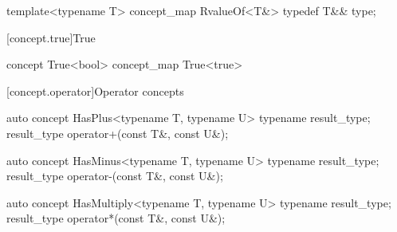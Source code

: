 \documentclass[american,twoside]{book}
\begin{document}
\begin{itemdecl}
template<typename T> concept_map RvalueOf<T&> {
  typedef T&& type;
}
\end{itemdecl}

\begin{itemdescr}
\pnum
{}
\end{itemdescr}

[concept.true]{True}

\begin{itemdecl}
concept True<bool> { }
concept_map True<true> { }
\end{itemdecl}

\begin{itemdescr}
\pnum
{}

\pnum
{}
\end{itemdescr}

[concept.operator]{Operator concepts}
\begin{itemdecl}
auto concept HasPlus<typename T, typename U> {
  typename result_type;
  result_type operator+(const T&, const U&);
}
\end{itemdecl}

\begin{itemdescr}
\pnum
{}
\end{itemdescr}

\begin{itemdecl}
auto concept HasMinus<typename T, typename U> {
  typename result_type;
  result_type operator-(const T&, const U&);
}
\end{itemdecl}

\begin{itemdescr}
\pnum
{}
\end{itemdescr}

\begin{itemdecl}
auto concept HasMultiply<typename T, typename U> {
  typename result_type;
  result_type operator*(const T&, const U&);
}
\end{itemdecl}
\end{document}
